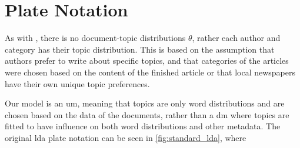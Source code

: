 \section{Plate Notation}
As with , there is no document-topic distributions $\theta$, rather each author and category has their topic distribution.
This is based on the assumption that authors prefer to write about specific topics, and that categories of the articles were chosen based on the content of the finished article or that local newspapers have their own unique topic preferences.

Our model is an \gls{um}, meaning that topics are only word distributions and are chosen based on the data of the documents, rather than a \gls{dm} where topics are fitted to have influence on both word distributions and other metadata.
The original \gls{lda} plate notation can be seen in \autoref{fig:standard_lda}, where 





